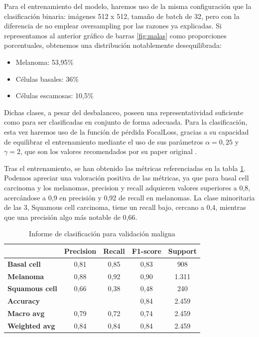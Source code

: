 Para el entrenamiento del modelo, haremos uso de la misma configuración que la clasificación binaria: imágenes 512 x 512, tamaño de batch de 32, pero con la diferencia de no emplear oversampling por las razones ya explicadas. Si representamos al anterior gráfico de barras \ref{fig:malas} como proporciones porcentuales, obtenemos una distribución notablemente desequilibrada:

\begin{itemize}
	\item Melanoma: 53,95\%
	\item Células basales: 36\%
	\item Células escamosas: 10,5\%
 \end{itemize}
 
 Dichas clases, a pesar del desbalanceo, poseen una representatividad suficiente como para ser clasificadas en conjunto de forma adecuada. Para la clasificación, esta vez haremos uso de la función de pérdida FocalLoss, gracias a su capacidad de equilibrar el entrenamiento mediante el uso de sus parámetros $\alpha = 0,25$ y $\gamma = 2$, que son los valores recomendados por su paper original \cite{lin2018focal}.
 
 Tras el entrenamiento, se han obtenido las métricas referenciadas en la tabla \ref{tab:malignometrics}. Podemos apreciar una valoración positiva de las métricas, ya que para basal cell carcinoma y los melanomas, precision y recall adquieren valores superiores a 0,8, acercándose a 0,9 en precisión y 0,92 de recall en melanomas.  La clase minoritaria de las 3, Squamous cell carcinoma, tiene un recall bajo, cercano a 0,4, mientras que una precisión algo más notable de 0,66.

\begin{table}[!ht]
	\centering
	\begin{tabular}{|l|c|c|c|c|}
		\hline
		& \textbf{Precision} & \textbf{Recall} & \textbf{F1-score} & \textbf{Support} \\
		\hline
	\textbf{	Basal cell} & 0,81 & 0,85 & 0,83 & 908 \\
		\textbf{Melanoma} & 0,88 & 0,92 & 0,90 & 1.311 \\
		\textbf{Squamous cell} & 0,66 & 0,38 & 0,48 & 240 \\
		\hline
		\textbf{Accuracy} &  &  & 0,84 & 2.459 \\ \hline
		\textbf{Macro avg} & 0,79& 0,72& 0,74&2.459\\
		\textbf{Weighted avg}&0,84&0,84&0,84&2.459\\
		\hline
	\end{tabular}
	\caption{Informe de clasificación para validación maligna}
	\label{tab:malignometrics}
\end{table}

